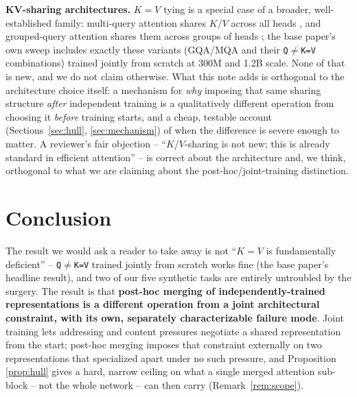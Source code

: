 \documentclass[11pt]{article}
\begin{document}
\textbf{KV-sharing architectures.} $K{=}V$ tying is a special case of a broader,
well-established family: multi-query attention shares $K/V$ across all heads
\cite{shazeer2019mqa}, and grouped-query attention shares them across groups of heads
\cite{ainslie2023gqa}; the base paper's own sweep includes exactly these variants
(GQA/MQA and their \texttt{Q}$\neq$\texttt{K=V} combinations) trained jointly from
scratch at 300M and 1.2B scale. None of that is new, and we do not claim otherwise.
What this note adds is orthogonal to the architecture choice itself: a mechanism for
\emph{why} imposing that same sharing structure \emph{after} independent training is a
qualitatively different operation from choosing it \emph{before} training starts, and
a cheap, testable account (Sections~\ref{sec:hull}, \ref{sec:mechanism}) of when the
difference is severe enough to matter. A reviewer's fair objection --
``$K$/$V$-sharing is not new; this is already standard in efficient attention'' -- is
correct about the architecture and, we think, orthogonal to what we are claiming about
the post-hoc/joint-training distinction.

\section{Conclusion}

The result we would ask a reader to take away is not ``$K=V$ is fundamentally
deficient'' -- \texttt{Q}$\neq$\texttt{K=V} trained jointly from scratch works fine
(the base paper's headline result), and two of our five synthetic tasks are entirely
untroubled by the surgery. The result is that \textbf{post-hoc merging of
independently-trained representations is a different operation from a joint
architectural constraint, with its own, separately characterizable failure mode}.
Joint training lets addressing and content pressures negotiate a shared
representation from the start; post-hoc merging imposes that constraint externally on
two representations that specialized apart under no such pressure, and Proposition~
\ref{prop:hull} gives a hard, narrow ceiling on what a single merged attention
sub-block -- not the whole network -- can then carry (Remark~\ref{rem:scope}).
\end{document}

